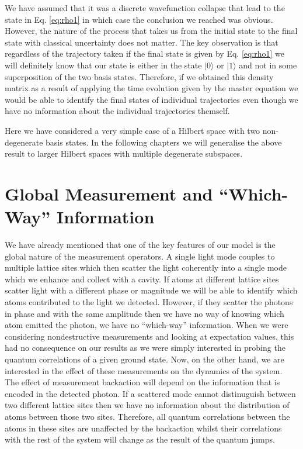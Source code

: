We have assumed that it was a discrete wavefunction collapse that lead
to the state in Eq. \eqref{eq:rho1} in which case the conclusion we
reached was obvious. However, the nature of the process that takes us
from the initial state to the final state with classical uncertainty
does not matter. The key observation is that regardless of the
trajectory taken if the final state is given by Eq. \eqref{eq:rho1} we
will definitely know that our state is either in the state
$| 0 \rangle$ or $| 1 \rangle$ and not in some superposition of the
two basis states. Therefore, if we obtained this density matrix as a
result of applying the time evolution given by the master equation we
would be able to identify the final states of individual trajectories
even though we have no information about the individual trajectories
themself.

Here we have considered a very simple case of a Hilbert space with two
non-degenerate basis states. In the following chapters we will
generalise the above result to larger Hilbert spaces with multiple
degenerate subspaces.

\section{Global Measurement and ``Which-Way'' Information}

We have already mentioned that one of the key features of our model is
the global nature of the measurement operators. A single light mode
couples to multiple lattice sites which then scatter the light
coherently into a single mode which we enhance and collect with a
cavity. If atoms at different lattice sites scatter light with a
different phase or magnitude we will be able to identify which atoms
contributed to the light we detected. However, if they scatter the
photons in phase and with the same amplitude then we have no way of
knowing which atom emitted the photon, we have no ``which-way''
information. When we were considering nondestructive measurements and
looking at expectation values, this had no consequence on our results
as we were simply interested in probing the quantum correlations of a
given ground state. Now, on the other hand, we are interested in the
effect of these measurements on the dynamics of the system. The effect
of measurement backaction will depend on the information that is
encoded in the detected photon. If a scattered mode cannot
distinuguish between two different lattice sites then we have no
information about the distribution of atoms between those two sites.
Therefore, all quantum correlations between the atoms in these sites
are unaffected by the backaction whilst their correlations with the
rest of the system will change as the result of the quantum jumps.

